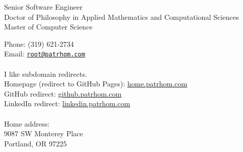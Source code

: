 \begin{minipage}[t]{0.5\textwidth}
  {\large Senior Software Engineer} \vspace{0.5em} \\
  \phantom{1} Doctor of Philosophy in Applied Mathematics and Computational Sciences  \vspace{0.5em} \\
  \phantom{1} Master of Computer Science\\
\end{minipage}
\hfill
\begin{minipage}[t]{0.4\textwidth}
  Phone: (319) 621-2734 \\
  Email: \href{mailto:root@patrhom.com}{\texttt{root@patrhom.com}} \\
  \\
  I like subdomain redirects.  \\
  Homepage (redirect to GitHub Pages): \url{home.patrhom.com} \\
  GitHub redirect: \url{github.patrhom.com} \\
  LinkedIn redirect: \url{linkedin.patrhom.com} \\
  \\
  Home address: \\
  9087 SW Monterey Place \\
  Portland, OR 97225
  
\end{minipage}

